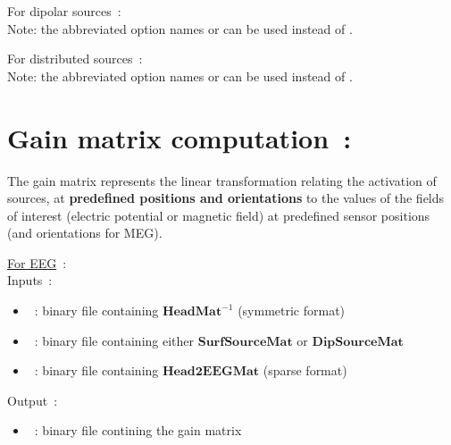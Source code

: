\medskip

\noindent
For dipolar sources~:\\
\noindent
{}
\medskip
Note:  the abbreviated option names  or  can be used instead of .

\medskip

\noindent
For distributed sources~:\\
\noindent
{}
\medskip
Note:   the abbreviated option names   or  can be used instead of .

\section{Gain matrix computation~:}
\label{sect: command gain}

The gain matrix represents the linear transformation relating the activation of sources, at \textbf{predefined positions and orientations} to the values of the fields of interest (electric potential or magnetic field) at predefined sensor positions (and orientations for MEG). 

\checkItem \underline{For EEG}~:\\
Inputs~:
\begin{itemize}
    \item {}~: binary file containing $\mathbf{HeadMat}^{-1}$ (symmetric format)
    \item {}~: binary file containing either  $\mathbf{SurfSourceMat}$ or  $\mathbf{DipSourceMat}$
    \item {}~: binary file containing $\mathbf{Head2EEGMat}$ (sparse format)
\end{itemize}
Output~:
\begin{itemize}
    \item {}~: binary file contining the gain matrix
\end{itemize}

\medskip

\noindent
{}


